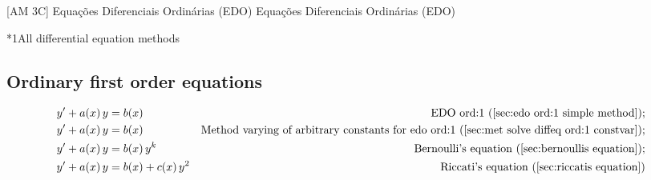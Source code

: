 \documentclass["AM3C-Slides_annotations.tex"]{subfiles}
\begin{document}

[AM 3C]
{Equações Diferenciais Ordinárias (EDO)} %
{Equações Diferenciais Ordinárias (EDO)} %

\begin{minipage}{60em}
  \begin{sectionBox}*1{All differential equation methods} %

    \begin{minipage}{40em}
      \subsection*{Ordinary first order equations}
      \begin{tcolorbox}
        \begin{align*}
          y' + a(x)\,y &= b(x)
          & \text{EDO ord:1 (\ref{sec:edo ord:1 simple method})}
          ; \\
          y' + a(x)\,y &= b(x)
          & \text{Method varying of arbitrary constants for edo ord:1 (\ref{sec:met solve diffeq ord:1 constvar})}
          ; \\
          y' + a(x)\,y &= b(x)\,y^k
          & \text{Bernoulli's equation (\ref{sec:bernoullis equation})}
          ; \\
          y' + a(x)\,y &= b(x) + c(x)\,y^2
          & \text{Riccati's equation (\ref{sec:riccatis equation})}
        \end{align*}
      \end{tcolorbox}
    \end{minipage}
    
    \begin{minipage}{60em}

\end{minipage}
\end{sectionBox}
\end{minipage}
\end{document}
